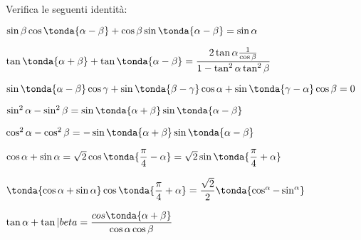 \begin{esercizio}\label{ese:03.1}
Verifica le seguenti identità:
 \begin{enumeratea}
  \item $\sin \beta \cos \tonda{\alpha - \beta} +
         \cos \beta \sin \tonda{\alpha - \beta} = \sin \alpha$
  \item $\tan \tonda{\alpha + \beta} + \tan \tonda{\alpha - \beta} =
         \dfrac{2 \tan \alpha \frac{1}{\cos \beta}}
               {1- \tan^2 \alpha \tan^2 \beta}$
  \item $\sin \tonda{\alpha - \beta} \cos \gamma +
         \sin \tonda{\beta - \gamma} \cos \alpha +
         \sin \tonda{\gamma - \alpha} \cos \beta = 0$
  \item $\sin^2 \alpha  - \sin^2 \beta = 
         \sin \tonda{\alpha + \beta} \sin \tonda{\alpha - \beta}$
  \item $\cos^2 \alpha  - \cos^2 \beta = 
         - \sin \tonda{\alpha + \beta} \sin \tonda{\alpha - \beta}$
  \item $\cos \alpha + \sin \alpha = 
  \sqrt{2} \cos \tonda{\dfrac{\pi}{4} - \alpha} = 
  \sqrt{2} \sin \tonda{\dfrac{\pi}{4} + \alpha}$
  \item $\tonda{\cos \alpha + \sin \alpha} 
         \cos \tonda{\dfrac{\pi}{4} + \alpha} =
         \dfrac{\sqrt{2}}{2} \tonda{\cos^ \alpha - \sin^ \alpha}$
  \item $\tan \alpha + \tan |beta =
         \dfrac{cos \tonda{\alpha + \beta}}{\cos \alpha \cos \beta}$
 \end{enumeratea}
\end{esercizio}

\subsubsection*{}

